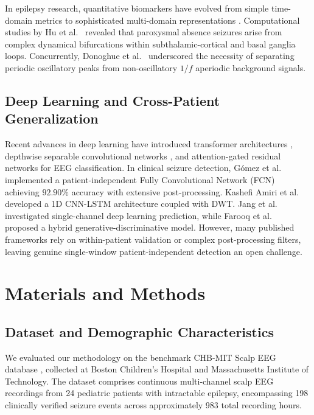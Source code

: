 \documentclass[pdflatex,sn-mathphys-num]{sn-jnl}
\begin{document}
In epilepsy research, quantitative biomarkers have evolved from simple time-domain metrics to sophisticated multi-domain representations \cite{gascoigne2023library,zhang2025self}. Computational studies by Hu et al.\ \cite{hu2025possible,hu2025dynamical} revealed that paroxysmal absence seizures arise from complex dynamical bifurcations within subthalamic-cortical and basal ganglia loops. Concurrently, Donoghue et al.\ \cite{donoghue2020parameterizing} underscored the necessity of separating periodic oscillatory peaks from non-oscillatory $1/f$ aperiodic background signals.

\subsection{Deep Learning and Cross-Patient Generalization}
Recent advances in deep learning have introduced transformer architectures \cite{wu2025large}, depthwise separable convolutional networks \cite{chen2026enhancing}, and attention-gated residual networks \cite{ye2025cprsca} for EEG classification. In clinical seizure detection, Gómez et al.\ \cite{gomez2020automatic} implemented a patient-independent Fully Convolutional Network (FCN) achieving $92.90\%$ accuracy with extensive post-processing. Kashefi Amiri et al.\ \cite{kashefiamiri2025epileptic} developed a 1D CNN-LSTM architecture coupled with DWT. Jang et al.\ \cite{jang2026single} investigated single-channel deep learning prediction, while Farooq et al.\ \cite{farooq2026patient} proposed a hybrid generative-discriminative model. However, many published frameworks rely on within-patient validation or complex post-processing filters, leaving genuine single-window patient-independent detection an open challenge.

\section{Materials and Methods}\label{sec:methods}

\subsection{Dataset and Demographic Characteristics}
We evaluated our methodology on the benchmark CHB-MIT Scalp EEG database \cite{guttag2010chb,goldberger2000physiobank,shoeb2009}, collected at Boston Children's Hospital and Massachusetts Institute of Technology. The dataset comprises continuous multi-channel scalp EEG recordings from 24 pediatric patients with intractable epilepsy, encompassing 198 clinically verified seizure events across approximately 983 total recording hours.
\end{document}
